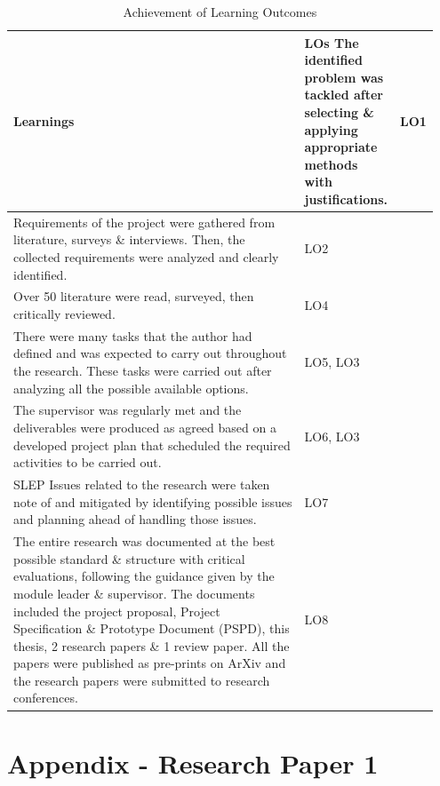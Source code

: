 \begin{longtable}{|p{0.8\linewidth}|p{0.1471\linewidth}|}
\caption{Achievement of Learning Outcomes}
\label{tab:achievement-learning-outcomes-table}
\\ 
\hline
\textbf{Learnings} & \textbf{LOs}\endfirsthead 
\hline
The identified problem was tackled after selecting \& applying appropriate methods with justifications. & LO1 \\
\hline
Requirements of the project were gathered from literature, surveys \& interviews. Then, the collected requirements were analyzed and clearly identified. & LO2 \\
\hline
Over 50 literature were read, surveyed, then critically reviewed. & LO4 \\
\hline
There were many tasks that the author had defined and was expected to carry out throughout the research. These tasks were carried out after analyzing all the possible available options. & LO5, LO3 \\
\hline
The supervisor was regularly met and the deliverables were produced as agreed based on a developed project plan that scheduled the required activities to be carried out. & LO6, LO3 \\
\hline
SLEP Issues related to the research were taken note of and mitigated by identifying possible issues and planning ahead of handling those issues. & LO7 \\
\hline
The entire research was documented at the best possible standard \& structure with critical evaluations, following the guidance given by the module leader \& supervisor. The documents included the project proposal, Project Specification \& Prototype Document (PSPD), this thesis, 2 research papers \& 1 review paper. All the papers were published as pre-prints on ArXiv and the research papers were submitted to research conferences. & LO8 \\
\hline
\end{longtable}


\newpage
\chapter{Appendix - Research Paper 1}

